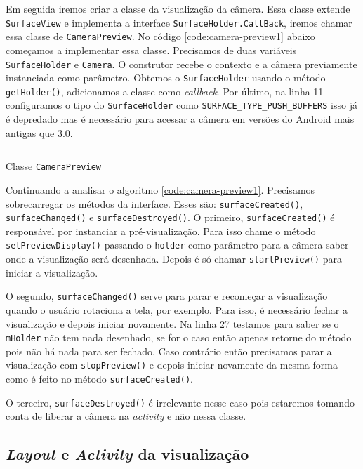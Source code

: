 \documentclass[a4paper,12pt,brazil]{book}
\begin{document}
\begin{singlespace}
		Em seguida iremos criar a classe da visualização da câmera. Essa classe extende \texttt{SurfaceView} e implementa a interface \texttt{SurfaceHolder.CallBack}, iremos chamar essa classe de \texttt{CameraPreview}. No código \ref{code:camera-preview1} abaixo começamos a implementar essa classe. Precisamos de duas variáveis \texttt{SurfaceHolder} e \texttt{Camera}. O construtor recebe o contexto e a câmera previamente instanciada como parâmetro. Obtemos o \texttt{SurfaceHolder} usando o método \texttt{getHolder()}, adicionamos a classe como \emph{callback}. Por último, na linha 11 configuramos o tipo do \texttt{SurfaceHolder} como \texttt{SURFACE\_TYPE\_PUSH\_BUFFERS} isso já é depredado mas é necessário para acessar a câmera em versões do Android mais antigas que 3.0.

		\begin{listing}[H]
		\inputminted[linenos=true,fontsize=\small,frame=lines, framesep=2mm, tabsize=2,numbersep=5pt]{java}{src/api/camera/camerapreview1.java}
		\caption{Classe \texttt{CameraPreview}}
		\label{code:camera-preview1}
		\end{listing} 	

		Continuando a analisar o algoritmo \ref{code:camera-preview1}. Precisamos sobrecarregar os métodos da interface. Esses são: \texttt{surfaceCreated()}, \texttt{surfaceChanged()} e \texttt{surfaceDestroyed()}. O primeiro, \texttt{surfaceCreated()} é responsável por instanciar a pré-visualização. Para isso chame o método \texttt{setPreviewDisplay()} passando o \texttt{holder} como parâmetro para a câmera saber onde a visualização será desenhada. Depois é só chamar \texttt{startPreview()} para iniciar a visualização. 

	O segundo, \texttt{surfaceChanged()} serve para parar e recomeçar a visualização quando o usuário rotaciona a tela, por exemplo. Para isso, é necessário fechar a visualização e depois iniciar novamente. Na linha 27 testamos para saber se o \texttt{mHolder} não tem nada desenhado, se for o caso então apenas retorne do método pois não há nada para ser fechado. Caso contrário então precisamos parar a visualização com \texttt{stopPreview()} e depois iniciar novamente da mesma forma como é feito no método \texttt{surfaceCreated()}.

	O terceiro, \texttt{surfaceDestroyed()} é irrelevante nesse caso pois estaremos tomando conta de liberar a câmera na \emph{activity} e não nessa classe.

	\subsection{\emph{Layout} e \emph{Activity} da visualização}


\end{singlespace}
\end{document}
